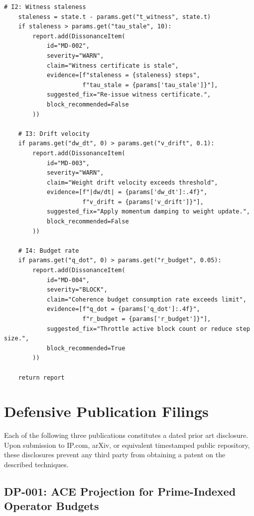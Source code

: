 \documentclass[12pt,letterpaper]{article}
\begin{document}
\begin{lstlisting}[caption={PMD: callable L0 invariant check returning
                   dissonance report},
                   label={lst:pmd}]
    # I2: Witness staleness
    staleness = state.t - params.get("t_witness", state.t)
    if staleness > params.get("tau_stale", 10):
        report.add(DissonanceItem(
            id="MD-002",
            severity="WARN",
            claim="Witness certificate is stale",
            evidence=[f"staleness = {staleness} steps",
                      f"tau_stale = {params['tau_stale']}"],
            suggested_fix="Re-issue witness certificate.",
            block_recommended=False
        ))

    # I3: Drift velocity
    if params.get("dw_dt", 0) > params.get("v_drift", 0.1):
        report.add(DissonanceItem(
            id="MD-003",
            severity="WARN",
            claim="Weight drift velocity exceeds threshold",
            evidence=[f"|dw/dt| = {params['dw_dt']:.4f}",
                      f"v_drift = {params['v_drift']}"],
            suggested_fix="Apply momentum damping to weight update.",
            block_recommended=False
        ))

    # I4: Budget rate
    if params.get("q_dot", 0) > params.get("r_budget", 0.05):
        report.add(DissonanceItem(
            id="MD-004",
            severity="BLOCK",
            claim="Coherence budget consumption rate exceeds limit",
            evidence=[f"q_dot = {params['q_dot']:.4f}",
                      f"r_budget = {params['r_budget']}"],
            suggested_fix="Throttle active block count or reduce step size.",
            block_recommended=True
        ))

    return report
\end{lstlisting}

\section{Defensive Publication Filings}

Each of the following three publications constitutes a dated prior art
disclosure. Upon submission to IP.com, arXiv, or equivalent
timestamped public repository, these disclosures prevent any third
party from obtaining a patent on the described techniques.

\subsection{DP-001: ACE Projection for Prime-Indexed Operator Budgets}
\end{document}
